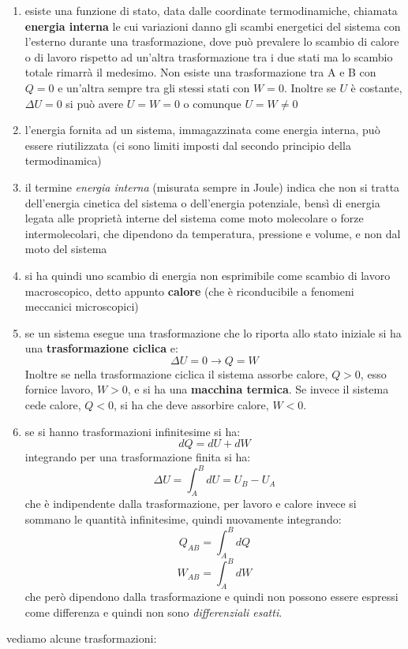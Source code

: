 \documentclass[a4paper,12pt, oneside]{book}
\begin{document}
\begin{enumerate}
	\item esiste una funzione di stato, data dalle coordinate termodinamiche, chiamata \textbf{energia interna} le cui variazioni danno gli scambi energetici del sistema con l'esterno durante una trasformazione, dove può prevalere lo scambio di calore o di lavoro rispetto ad un'altra trasformazione tra i due stati ma lo scambio totale rimarrà il medesimo. Non esiste una trasformazione tra A e B con $Q=0$ e un'altra sempre tra gli stessi stati con $W=0$. Inoltre se $U$ è costante, $\Delta U=0$ si può avere $U=W=0$ o comunque $U=W\neq 0$
	\item l'energia fornita ad un sistema, immagazzinata come energia interna, può essere riutilizzata (ci sono limiti imposti dal secondo principio della termodinamica)
	\item il termine \textit{energia interna} (misurata sempre in Joule) indica che non si tratta dell'energia cinetica del sistema o dell'energia potenziale, bensì di energia legata alle proprietà interne del sistema come moto molecolare o forze intermolecolari, che dipendono da temperatura, pressione e volume, e non dal moto del sistema
	\item si ha quindi uno scambio di energia non esprimibile come scambio di lavoro macroscopico, detto appunto \textbf{calore} (che è riconducibile a fenomeni meccanici microscopici)
	\item se un sistema esegue una trasformazione che lo riporta allo stato iniziale si ha una \textbf{trasformazione ciclica} e:
	      $$\Delta U=0\longrightarrow Q=W$$
	      Inoltre se nella trasformazione ciclica il sistema assorbe calore, $Q>0$, esso fornice lavoro, $W>0$, e si ha una \textbf{macchina termica}. Se invece il sistema cede calore, $Q<0$, si ha che deve assorbire calore, $W<0$.
	\item se si hanno trasformazioni infinitesime si ha:
	      $$dQ=dU+dW$$
	      integrando per una trasformazione finita si ha:
	      $$\Delta U=\int_A^B dU=U_B-U_A$$
	      che è indipendente dalla trasformazione, per lavoro e calore invece si sommano le quantità infinitesime, quindi nuovamente integrando:
	      $$Q_{AB}=\int_A^B dQ$$
	      $$W_{AB}=\int_A^B dW$$
	      che però dipendono dalla trasformazione e quindi non possono essere espressi come differenza e quindi non sono \textit{differenziali esatti}.
\end{enumerate}
vediamo alcune trasformazioni:
\end{document}
